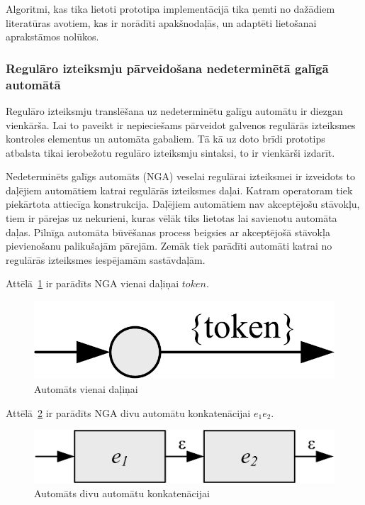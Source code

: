 Algoritmi, kas tika lietoti prototipa implementācijā tika ņemti no dažādiem literatūras avotiem, kas ir norādīti apakšnodaļās, un adaptēti lietošanai aprakstāmos nolūkos.

\subsubsection{Regulāro izteiksmju pārveidošana nedeterminētā galīgā automātā}


Regulāro izteiksmju translēšana uz nedeterminētu galīgu automātu ir diezgan vienkārša. Lai to paveikt ir nepieciešams  pārveidot galvenos regulārās izteiksmes kontroles elementus un automāta gabaliem. Tā kā uz doto brīdi prototips atbalsta tikai ierobežotu regulāro izteiksmju sintaksi, to ir vienkārši izdarīt.

Nedeterminēts galīgs automāts (NGA) veselai regulārai izteiksmei ir izveidots to daļējiem automātiem katrai regulārās izteiksmes daļai. Katram operatoram tiek piekārtota attiecīga konstrukcija. Daļējiem automātiem nav akceptējošu stāvokļu, tiem ir pārejas uz nekurieni, kuras vēlāk tiks lietotas lai savienotu automāta daļas. Pilnīga automāta būvēšanas process beigsies ar akceptējošā stāvokļa pievienošanu palikušajām pārejām. Zemāk tiek parādīti automāti katrai no regulārās izteiksmes iespējamām sastāvdaļām.

Attēlā~\ref{fig:auto_token} ir parādīts NGA vienai daļiņai ${token}$.
\begin{figure}[H]
  \centering
    \includegraphics[scale=1.5]{pictures/auto_token}
  \caption{\label{fig:auto_token}Automāts vienai daļiņai}
\end{figure}

Attēlā~\ref{fig:auto_sequence} ir parādīts NGA divu automātu konkatenācijai $e_1 e_2$.
\begin{figure}[H]
  \centering
    \includegraphics[scale=1.5]{pictures/auto_sequence}
  \caption{\label{fig:auto_sequence}Automāts divu automātu konkatenācijai}
\end{figure}

